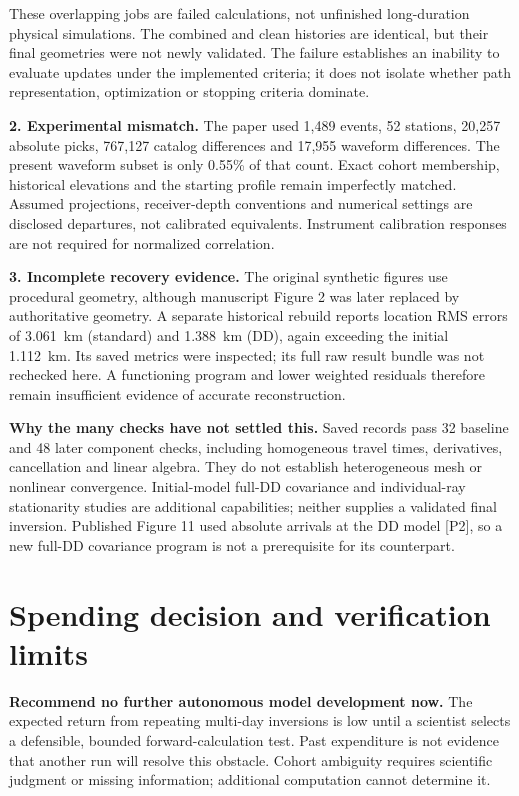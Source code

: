 \documentclass[10pt,letterpaper]{article}
\begin{document}
These overlapping jobs are failed calculations, not unfinished long-duration physical simulations. The combined and clean histories are identical, but their final geometries were not newly validated. The failure establishes an inability to evaluate updates under the implemented criteria; it does not isolate whether path representation, optimization or stopping criteria dominate.

\textbf{2. Experimental mismatch.}
The paper used 1,489 events, 52 stations, 20,257 absolute picks, 767,127 catalog differences and 17,955 waveform differences. The present waveform subset is only 0.55\% of that count. Exact cohort membership, historical elevations and the starting profile remain imperfectly matched. Assumed projections, receiver-depth conventions and numerical settings are disclosed departures, not calibrated equivalents. Instrument calibration responses are not required for normalized correlation.

\textbf{3. Incomplete recovery evidence.}
The original synthetic figures use procedural geometry, although manuscript Figure 2 was later replaced by authoritative geometry. A separate historical rebuild reports location RMS errors of 3.061~km (standard) and 1.388~km (DD), again exceeding the initial 1.112~km. Its saved metrics were inspected; its full raw result bundle was not rechecked here. A functioning program and lower weighted residuals therefore remain insufficient evidence of accurate reconstruction.

\textbf{Why the many checks have not settled this.}
Saved records pass 32 baseline and 48 later component checks, including homogeneous travel times, derivatives, cancellation and linear algebra. They do not establish heterogeneous mesh or nonlinear convergence. Initial-model full-DD covariance and individual-ray stationarity studies are additional capabilities; neither supplies a validated final inversion. Published Figure 11 used absolute arrivals at the DD model [P2], so a new full-DD covariance program is not a prerequisite for its counterpart.

\newpage
\section*{Spending decision and verification limits}
\textbf{Recommend no further autonomous model development now.}
The expected return from repeating multi-day inversions is low until a scientist selects a defensible, bounded forward-calculation test. Past expenditure is not evidence that another run will resolve this obstacle. Cohort ambiguity requires scientific judgment or missing information; additional computation cannot determine it.
\end{document}
